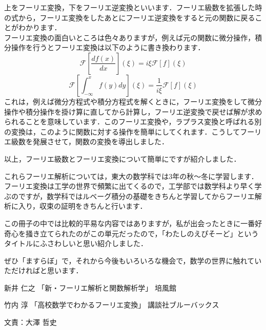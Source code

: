 上をフーリエ変換，下をフーリエ逆変換といいます．フーリエ級数を拡張した時の式から，フーリエ変換をしたあとにフーリエ逆変換をすると元の関数に戻ることがわかります．\\
フーリエ変換の面白いところは色々ありますが，例えば元の関数に微分操作，積分操作を行うとフーリエ変換は以下のように書き換わります．\\
\[
  \mathcal{F}[\frac{df(x)}{dx}](\xi) = i\xi \mathcal{F}[f](\xi)
\]
\[
  \mathcal{F}[\int_{-\infty}^x f(y) dy](\xi) =\frac{1}{i\xi} \mathcal{F}[f](\xi)
\]
これは，例えば微分方程式や積分方程式を解くときに，フーリエ変換をして微分操作や積分操作を掛け算に直してから計算し，フーリエ逆変換で戻せば解が求められることを意味しています．このフーリエ変換や，ラプラス変換と呼ばれる別の変換は，このように関数に対する操作を簡単にしてくれます．こうしてフーリエ級数を発展させて，関数の変換を導出しました．

以上，フーリエ級数とフーリエ変換について簡単にですが紹介しました．

これらフーリエ解析については，東大の数学科では3年の秋〜冬に学習します．フーリエ変換は工学の世界で頻繁に出てくるので，工学部では数学科より早く学ぶのですが，数学科ではルベーグ積分の基礎をきちんと学習してからフーリエ解析に入り，収束の証明をきちんと行います．

この冊子の中では比較的平易な内容ではありますが，私が出会ったときに一番好奇心を掻き立てられたのがこの単元だったので，「わたしのえぴそーど」というタイトルにふさわしいと思い紹介しました．

ぜひ「ますらぼ」で，それから今後もいろいろな機会で，数学の世界に触れていただければと思います．
\begin{thebibliography}{9}
\item 新井 仁之 「新・フーリエ解析と関数解析学」 培風館
\item 竹内 淳 「高校数学でわかるフーリエ変換」 講談社ブルーバックス
\end{thebibliography}

文責：大澤 哲史
